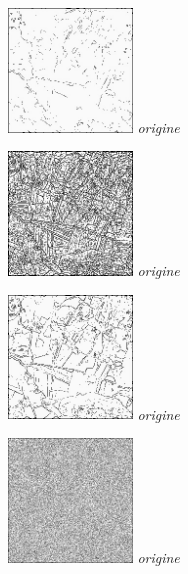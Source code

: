 \documentclass[a4,12pt]{article}
\begin{document}
\begin{minipage}[c]{0.20\linewidth}
	\begin{center}
		\includegraphics[width = 33mm]{./img/p2test_grad_fin_aqitain_t10.jpg}
		\textit{origine}
	\end{center}
\end{minipage}
\begin{minipage}[c]{0.20\linewidth}
	\begin{center}
		\includegraphics[width = 33mm]{./img/p2test_grad_fin_aqitain_t1.jpg}
		\textit{origine}
	\end{center}
\end{minipage}
\begin{minipage}[c]{0.20\linewidth}
	\begin{center}
		\includegraphics[width = 33mm]{./img/p2test_grad_fin_aqitain_t5.jpg}
		\textit{origine}
	\end{center}
\end{minipage}
\begin{minipage}[c]{0.20\linewidth}
	\begin{center}
		\includegraphics[width = 33mm]{./img/p2test_grad_fin_globules10_t15.jpg}
		\textit{origine}
	\end{center}
\end{minipage}
\end{document}
